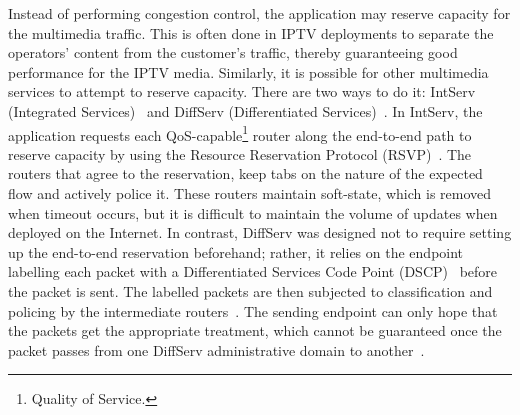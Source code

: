 Instead of performing congestion control, the application may reserve capacity
for the multimedia traffic. This is often done in IPTV deployments to
separate the operators' content from the customer's traffic, thereby
guaranteeing good performance for the IPTV media. Similarly, it is possible
for other multimedia services to attempt to reserve capacity. There are two
ways to do it: IntServ (Integrated Services)~\cite{rfc1633} and DiffServ
(Differentiated Services)~\cite{rfc2474}. In IntServ, the application requests
each QoS-capable\footnote{Quality of Service.} router along the end-to-end path to reserve capacity by
using the Resource Reservation Protocol (RSVP)~\cite{rfc2205}. The routers
that agree to the reservation, keep tabs on the nature of the expected flow
and actively police it. These routers maintain soft-state, which is removed
when timeout occurs, but it is difficult to maintain the volume of updates
when deployed on the Internet. In contrast, DiffServ was designed not to
require setting up the end-to-end reservation beforehand; rather, it relies on the
endpoint labelling each packet with a Differentiated Services
Code Point (DSCP)~\cite{rfc2475} before the packet is sent. The labelled packets are then subjected to
classification and policing by the intermediate routers~\cite{rfc5865}. The
sending endpoint can only hope that the packets get the appropriate treatment,
which cannot be guaranteed once the packet passes from one DiffServ
administrative domain to another~\cite{draft.rtcweb.qos}.





